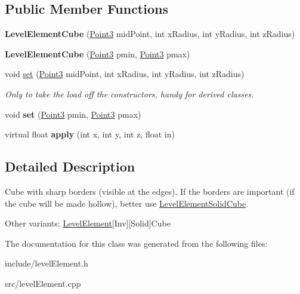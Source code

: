 \subsection*{\-Public \-Member \-Functions}
\begin{DoxyCompactItemize}
\item 
\hypertarget{classLevelElementCube_a212e75f32ede304af31a2ea758b31395}{
{\bfseries \-Level\-Element\-Cube} (\hyperlink{classPoint3}{\-Point3} mid\-Point, int x\-Radius, int y\-Radius, int z\-Radius)}
\label{d4/dce/classLevelElementCube_a212e75f32ede304af31a2ea758b31395}

\item 
\hypertarget{classLevelElementCube_a5ea728ed35ed7638a2e5459acf45ef98}{
{\bfseries \-Level\-Element\-Cube} (\hyperlink{classPoint3}{\-Point3} pmin, \hyperlink{classPoint3}{\-Point3} pmax)}
\label{d4/dce/classLevelElementCube_a5ea728ed35ed7638a2e5459acf45ef98}

\item 
\hypertarget{classLevelElementCube_a309ef9ab301bd20108c63b6f1e4989e7}{
void \hyperlink{classLevelElementCube_a309ef9ab301bd20108c63b6f1e4989e7}{set} (\hyperlink{classPoint3}{\-Point3} mid\-Point, int x\-Radius, int y\-Radius, int z\-Radius)}
\label{d4/dce/classLevelElementCube_a309ef9ab301bd20108c63b6f1e4989e7}

\begin{DoxyCompactList}\small\item\em \-Only to take the load off the constructors, handy for derived classes. \end{DoxyCompactList}\item 
\hypertarget{classLevelElementCube_a09ef9ce2b1eef20675490cce93e6151e}{
void {\bfseries set} (\hyperlink{classPoint3}{\-Point3} pmin, \hyperlink{classPoint3}{\-Point3} pmax)}
\label{d4/dce/classLevelElementCube_a09ef9ce2b1eef20675490cce93e6151e}

\item 
\hypertarget{classLevelElementCube_af44fb0ac22dc226c82ad0f37be870368}{
virtual float {\bfseries apply} (int x, int y, int z, float in)}
\label{d4/dce/classLevelElementCube_af44fb0ac22dc226c82ad0f37be870368}

\end{DoxyCompactItemize}


\subsection{\-Detailed \-Description}
\-Cube with sharp borders (visible at the edges). \-If the borders are important (if the cube will be made hollow), better use \hyperlink{classLevelElementSolidCube}{\-Level\-Element\-Solid\-Cube}. 

\-Other variants\-: \hyperlink{classLevelElement}{\-Level\-Element}\mbox{[}\-Inv\mbox{]}\mbox{[}\-Solid\mbox{]}\-Cube 

\-The documentation for this class was generated from the following files\-:\begin{DoxyCompactItemize}
\item 
include/level\-Element.\-h\item 
src/level\-Element.\-cpp\end{DoxyCompactItemize}
